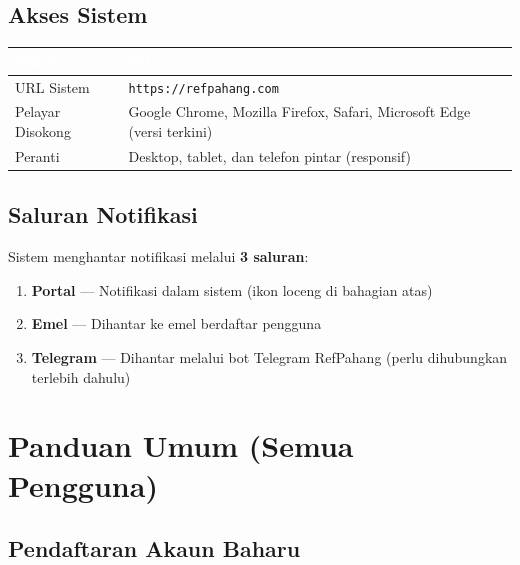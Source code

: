 \documentclass[12pt,a4paper]{report}
\begin{document}
\section{Akses Sistem}

\begin{table}[H]
\centering
{}
\begin{tabularx}{\textwidth}{l X}
\toprule
\rowcolor{tableheader}
\textcolor{white}{\textbf{Maklumat}} & \textcolor{white}{\textbf{Nilai}} \\
\midrule
URL Sistem & \texttt{https://refpahang.com} \\
Pelayar Disokong & Google Chrome, Mozilla Firefox, Safari, Microsoft Edge (versi terkini) \\
Peranti & Desktop, tablet, dan telefon pintar (responsif) \\
\bottomrule
\end{tabularx}
\end{table}

\section{Saluran Notifikasi}

Sistem menghantar notifikasi melalui \textbf{3 saluran}:

\begin{enumerate}[label=\textcolor{pbnpblue}{\textbf{\arabic*.}}, leftmargin=2em]
  \item \textbf{Portal} --- Notifikasi dalam sistem (ikon loceng di bahagian atas)
  \item \textbf{Emel} --- Dihantar ke emel berdaftar pengguna
  \item \textbf{Telegram} --- Dihantar melalui bot Telegram RefPahang (perlu dihubungkan terlebih dahulu)
\end{enumerate}

\chapter{Panduan Umum (Semua Pengguna)}

\section{Pendaftaran Akaun Baharu}
\end{document}
